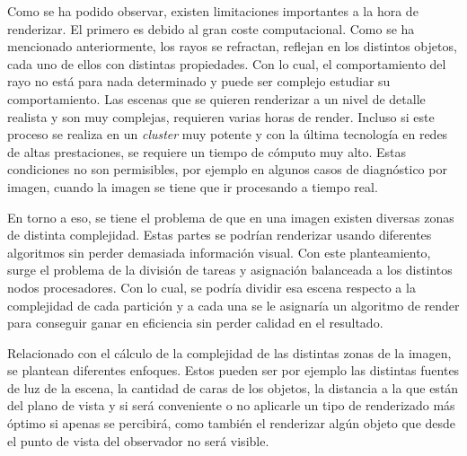 Como se ha podido observar, existen limitaciones importantes a la hora de renderizar. El primero es debido
al gran coste computacional. Como se ha mencionado anteriormente, los rayos se refractan, reflejan en los distintos objetos,
cada uno de ellos con distintas propiedades. Con lo cual, el comportamiento del rayo no está para nada determinado y puede
ser complejo estudiar su comportamiento. Las escenas que se quieren renderizar a un nivel de detalle realista y son
muy complejas, requieren varias horas de render. Incluso si este proceso se realiza en un \emph{cluster} muy potente
y con la última tecnología en redes de altas prestaciones, se requiere un tiempo de cómputo muy alto. Estas condiciones no son permisibles, por ejemplo en algunos casos de diagnóstico por imagen, cuando la imagen se tiene que ir procesando a tiempo real.

En torno a eso, se tiene el problema de que en una imagen existen diversas zonas de distinta complejidad. Estas partes se podrían renderizar usando diferentes algoritmos sin perder demasiada información visual\cite{magarro}. Con este planteamiento,  surge el problema de la división de tareas y asignación balanceada a los distintos nodos procesadores. Con lo cual, se podría dividir esa escena respecto a la complejidad de cada partición
y a cada una se le asignaría un algoritmo de render para conseguir ganar en eficiencia sin perder calidad en el resultado.

Relacionado con el cálculo de la complejidad de las distintas zonas de la imagen, se plantean diferentes enfoques. Estos pueden ser por ejemplo
las distintas fuentes de luz de la escena, la cantidad de caras de los objetos, la distancia a la que están del plano de vista y si será conveniente o no
aplicarle un tipo de renderizado más óptimo si apenas se percibirá, como también el renderizar algún objeto que desde el punto de vista del observador
no será visible.






